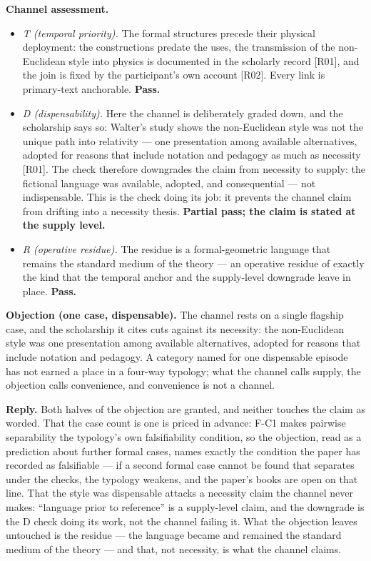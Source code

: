 \documentclass[11pt,a4paper]{article}
\begin{document}
\textbf{Channel assessment.}

\begin{itemize}[leftmargin=1.6em,itemsep=2pt,parsep=0pt,topsep=3pt]
\item \textit{T (temporal priority).} The formal structures precede their physical deployment: the constructions predate the uses, the transmission of the non-Euclidean style into physics is documented in the scholarly record [R01], and the join is fixed by the participant's own account [R02]. Every link is primary-text anchorable. \textbf{Pass.}
\item \textit{D (dispensability).} Here the channel is deliberately graded down, and the scholarship says so: Walter's study shows the non-Euclidean style was not the unique path into relativity — one presentation among available alternatives, adopted for reasons that include notation and pedagogy as much as necessity [R01]. The check therefore downgrades the claim from necessity to supply: the fictional language was available, adopted, and consequential — not indispensable. This is the check doing its job: it prevents the channel claim from drifting into a necessity thesis. \textbf{Partial pass; the claim is stated at the supply level.}
\item \textit{R (operative residue).} The residue is a formal-geometric language that remains the standard medium of the theory — an operative residue of exactly the kind that the temporal anchor and the supply-level downgrade leave in place. \textbf{Pass.}
\end{itemize}

\textbf{Objection (one case, dispensable).} The channel rests on a single flagship case, and the scholarship it cites cuts against its necessity: the non-Euclidean style was one presentation among available alternatives, adopted for reasons that include notation and pedagogy. A category named for one dispensable episode has not earned a place in a four-way typology; what the channel calls supply, the objection calls convenience, and convenience is not a channel.

\textbf{Reply.} Both halves of the objection are granted, and neither touches the claim as worded. That the case count is one is priced in advance: F-C1 makes pairwise separability the typology's own falsifiability condition, so the objection, read as a prediction about further formal cases, names exactly the condition the paper has recorded as falsifiable — if a second formal case cannot be found that separates under the checks, the typology weakens, and the paper's books are open on that line. That the style was dispensable attacks a necessity claim the channel never makes: ``language prior to reference'' is a supply-level claim, and the downgrade is the D check doing its work, not the channel failing it. What the objection leaves untouched is the residue — the language became and remained the standard medium of the theory — and that, not necessity, is what the channel claims.
\end{document}
